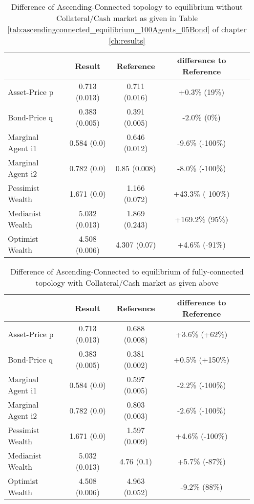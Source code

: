 \documentclass[Bachelorarbeit.tex]{subfiles}
\begin{document}
\begin{table}[H]
	\caption{Difference of Ascending-Connected topology to equilibrium without Collateral/Cash market as given in Table \ref{tab:ascendingconnected_equilibrium_100Agents_05Bond} of chapter \ref{ch:results}}
	\centering
	\begin{tabular} { l c c c r }
		& Result & Reference & difference to Reference \\
		\hline
		Asset-Price p & 0.713 (0.013) & 0.711 (0.016) & +0.3\% (19\%) \\
		Bond-Price q & 0.383 (0.005) & 0.391 (0.005) & -2.0\% (0\%) \\
		Marginal Agent i1 & 0.584 (0.0) & 0.646 (0.012) & -9.6\% (-100\%) \\
		Marginal Agent i2 & 0.782 (0.0) & 0.85 (0.008) & -8.0\% (-100\%) \\
		\hline
		Pessimist Wealth & 1.671 (0.0) & 1.166 (0.072) & +43.3\% (-100\%) \\
		Medianist Wealth & 5.032 (0.013) & 1.869 (0.243) & +169.2\% (95\%) \\
		Optimist Wealth & 4.508 (0.006) & 4.307 (0.07) & +4.6\% (-91\%) \\
		\hline
	\end{tabular}
\end{table}

\begin{table}[H]
	\caption{Difference of Ascending-Connected to equilibrium of fully-connected topology with Collateral/Cash market as given above}
	\centering
	\begin{tabular} { l c c c r }
		& Result & Reference & difference to Reference \\
		\hline
		Asset-Price p & 0.713 (0.013) & 0.688 (0.008) & +3.6\% (+62\%) \\
		Bond-Price q & 0.383 (0.005) & 0.381 (0.002) & +0.5\% (+150\%) \\
		Marginal Agent i1 & 0.584 (0.0) & 0.597 (0.005) & -2.2\% (-100\%) \\
		Marginal Agent i2 & 0.782 (0.0) & 0.803 (0.003) & -2.6\% (-100\%) \\
		\hline
		Pessimist Wealth & 1.671 (0.0) & 1.597 (0.009) & +4.6\% (-100\%) \\
		Medianist Wealth & 5.032 (0.013) & 4.76 (0.1) & +5.7\% (-87\%) \\
		Optimist Wealth & 4.508 (0.006) & 4.963 (0.052) & -9.2\% (88\%) \\
		\hline
	\end{tabular}
\end{table}
\end{document}
